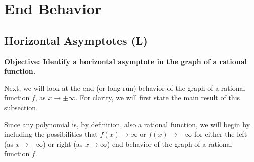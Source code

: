 \documentclass[12pt]{book}
\theoremstyle{definition}
\begin{document}
\section{End Behavior}
\subsection{Horizontal Asymptotes (L)}
{\bf Objective: Identify a horizontal asymptote in the graph of a rational function.}\par
Next, we will look at the end (or long run) behavior of the graph of a rational function $f$, as $x\rightarrow\pm\infty$.  For clarity, we will first state the main result of this subsection.
\begin{center}
\end{center}
Since any polynomial is, by definition, also a rational function, we will begin by including the possibilities that $f(x)\rightarrow\infty$ or $f(x)\rightarrow -\infty$ for either the left (as $x\rightarrow -\infty$) or right (as $x\rightarrow\infty$) end behavior of the graph of a rational function $f$.
\end{document}
